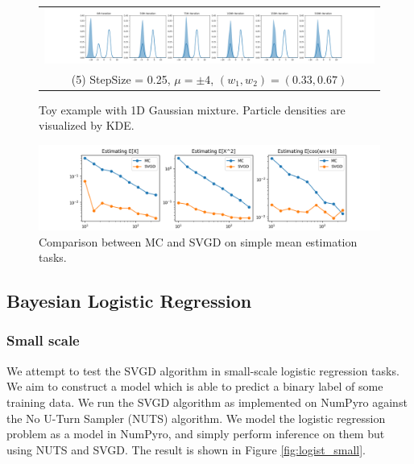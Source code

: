 \begin{figure}[h]
    \begin{tabular}{@{}c@{}}
        \includegraphics[width=\textwidth]{figs/toy-figure1_step0.25_mu4.0_w0.33_gaussian.png} \\
        \small (5) StepSize = 0.25, $\mu = \pm 4$, $(w_1, w_2) = (0.33, 0.67)$
    \end{tabular}
     
    \caption{Toy example with 1D Gaussian mixture. Particle densities are visualized by KDE.}
    \label{fig:toy1dgaussian}
\end{figure}

\begin{figure}[h]
    \centering
    \includegraphics[width=\textwidth]{figs/toy-figure2.png}
    \caption{Comparison between MC and SVGD on simple mean estimation tasks. }
    \label{fig:my_label}
\end{figure}

\subsection{Bayesian Logistic Regression}
\subsubsection{Small scale}
We attempt to test the SVGD algorithm in small-scale logistic regression tasks. We aim to construct a model which is able to predict a binary label of some training data. We run the SVGD algorithm as implemented on NumPyro against the No U-Turn Sampler (NUTS) algorithm. We model the logistic regression problem as a model in NumPyro, and simply perform inference on them but using NUTS and SVGD. The result is shown in Figure \ref{fig:logist_small}.

